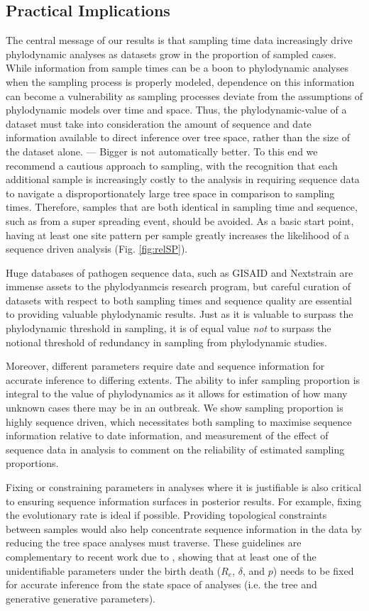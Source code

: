 \documentclass{article}
\begin{document}
\subsection*{Practical Implications}
The central message of our results is that sampling time data increasingly drive phylodynamic analyses as datasets grow in the proportion of sampled cases. While information from sample times can be a boon to phylodynamic analyses when the sampling process is properly modeled, dependence on this information can become a vulnerability as sampling processes deviate from the assumptions of phylodynamic models over time and space. Thus, the phylodynamic-value of a dataset must take into consideration the amount of sequence and date information available to direct inference over tree space, rather than the size of the dataset alone. --- Bigger is not automatically better. To this end we recommend a cautious approach to sampling, with the recognition that each additional sample is increasingly costly to the analysis in requiring sequence data to navigate a disproportionately large tree space in comparison to sampling times. Therefore, samples that are both identical in sampling time and sequence, such as from a super spreading event, should be avoided. As a basic start point, having at least one site pattern per sample greatly increases the likelihood of a sequence driven analysis (Fig. \ref{fig:relSP}).

Huge databases of pathogen sequence data, such as GISAID and Nextstrain are immense assets to the phylodyanmcis research program, but careful curation of datasets with respect to both sampling times and sequence quality are essential to providing valuable phylodynamic results. Just as it is valuable to surpass the phylodynamic threshold in sampling, it is of equal value \textit{not} to surpass the notional threshold of redundancy in sampling from phylodynamic studies.

Moreover, different parameters require date and sequence information for accurate inference to differing extents. The ability to infer sampling proportion is integral to the value of phylodynamics as it allows for estimation of how many unknown cases there may be in an outbreak. We show sampling proportion is highly sequence driven, which necessitates both sampling to maximise sequence information relative to date information, and measurement of the effect of sequence data in analysis to comment on the reliability of estimated sampling proportions.

Fixing or constraining parameters in analyses where it is justifiable is also critical to ensuring sequence information surfaces in posterior results. For example, fixing the evolutionary rate is ideal if possible. Providing topological constraints between samples would also help concentrate sequence information in the data by reducing the tree space analyses must traverse. These guidelines are complementary to recent work due to \citet{louca2021fundamental}, showing that at least one of the unidentifiable parameters under the birth death ($R_e$, $\delta$, and $p$) needs to be fixed for accurate inference from the state space  of analyses (i.e. the tree and generative generative parameters).
\end{document}
